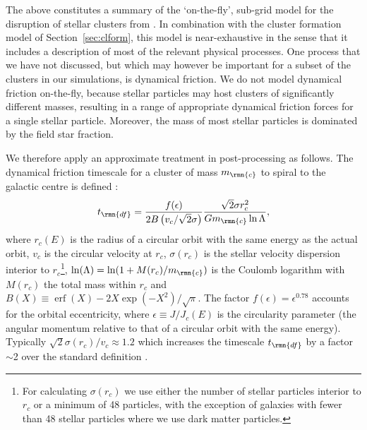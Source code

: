 \documentclass[fleqn,usenatbib]{mnras}
\DeclareMathOperator\erf{erf}
\begin{document}
The above constitutes a summary of the `on-the-fly', sub-grid model for the disruption of stellar clusters from \citet{Kruijssen_et_al_11}. In combination with the cluster formation model of Section~\ref{sec:clform}, this model is near-exhaustive in the sense that it includes a description of most of the relevant physical processes. One process that we have not discussed, but which may however be important for a subset of the clusters in our simulations, is dynamical friction. We do not model dynamical friction on-the-fly, because stellar particles may host clusters of significantly different masses, resulting in a range of appropriate dynamical friction forces for a single stellar particle. Moreover, the mass of most stellar particles is dominated by the field star fraction. 

We therefore apply an approximate treatment in post-processing as follows. The dynamical friction timescale for a cluster of mass $m_\rmn{c}$ to spiral to the galactic centre is defined \citep{Lacey_and_Cole_93}:
\begin{equation} \label{eq:tdf}
t_\rmn{df} = \frac{f(\epsilon)}{2 B\left(v_c/\sqrt{2}\sigma\right)} \frac{\sqrt{2} \sigma r_c^2 }{ G m_\rmn{c} \ln{\Lambda} } ,
\end{equation}
where $r_c(E)$ is the radius of a circular orbit with the same energy as the actual orbit, $v_c$ is the circular velocity at $r_c$, $\sigma(r_c)$ is the stellar velocity dispersion interior to $r_c$\footnote{For calculating $\sigma(r_c)$ we use either the number of stellar particles interior to $r_c$ or a minimum of 48 particles, with the exception of galaxies with fewer than 48 stellar particles where we use dark matter particles.}, $\ln(\Lambda) = \ln(1+M(r_c)/m_\rmn{c})$ is the Coulomb logarithm with $M(r_c)$ the total mass within $r_c$ and $B(X) \equiv \erf(X) - 2 X \exp(-X^2) / \sqrt{\pi}$. The factor $f(\epsilon) = \epsilon^{0.78}$ \citep{Lacey_and_Cole_93} accounts for the orbital eccentricity, where $\epsilon \equiv J/J_c(E)$ is the circularity parameter (the angular momentum relative to that of a circular orbit with the same energy). Typically $\sqrt{2} \sigma(r_c)/v_c \approx 1.2$ which increases the timescale $t_\rmn{df}$ by a factor $\sim$2 over the standard definition \citep[with $B(1)$ and $\sigma=v_c/\sqrt{2}$,][]{Binney_and_Tremaine_08}.
\end{document}
